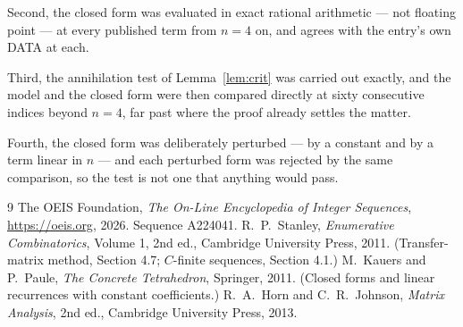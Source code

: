 \documentclass[11pt,a4paper]{article}
\theoremstyle{plain}
\theoremstyle{definition}
\begin{document}
Second, the closed form was evaluated in exact rational arithmetic --- not floating point ---
at every published term from $n=4$ on, and agrees with the entry's own DATA at each.

Third, the annihilation test of Lemma~\ref{lem:crit} was carried out exactly, and the model
and the closed form were then compared directly at sixty consecutive indices beyond
$n=4$, far past where the proof already settles the matter.

Fourth, the closed form was deliberately perturbed --- by a constant and by a term linear in
$n$ --- and each perturbed form was rejected by the same comparison, so the test is not one
that anything would pass.

\begin{thebibliography}{9}
 The OEIS Foundation, \emph{The On-Line Encyclopedia of Integer
Sequences}, \url{https://oeis.org}, 2026. Sequence A224041.
 R.~P.~Stanley, \emph{Enumerative Combinatorics}, Volume 1, 2nd ed.,
Cambridge University Press, 2011. (Transfer-matrix method, Section 4.7; $C$-finite sequences,
Section 4.1.)
 M.~Kauers and P.~Paule, \emph{The Concrete Tetrahedron}, Springer, 2011.
(Closed forms and linear recurrences with constant coefficients.)
 R.~A.~Horn and C.~R.~Johnson, \emph{Matrix Analysis}, 2nd ed., Cambridge
University Press, 2013.
\end{thebibliography}
\end{document}
